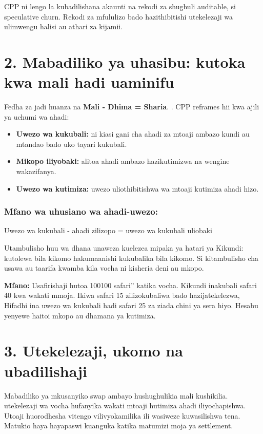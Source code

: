 \documentclass[11pt]{article}
\begin{document}
CPP ni lengo la kubadilishana akaunti na rekodi za shughuli auditable, si speculative churn. Rekodi za mfululizo bado hazithibitishi utekelezaji wa ulimwengu halisi au athari za kijamii.


\section*{2. Mabadiliko ya uhasibu: kutoka kwa mali hadi uaminifu}

Fedha za jadi huanza na \textbf{Mali - Dhima = Sharia}. . CPP reframes hii kwa ajili ya uchumi wa ahadi:

\begin{itemize}[leftmargin=*]
\item \textbf{Uwezo wa kukubali:} ni kiasi gani cha ahadi za mtoaji ambazo kundi au mtandao bado uko tayari kukubali.
\item \textbf{Mikopo iliyobaki:} alitoa ahadi ambazo hazikutimizwa na wengine wakazifanya.
\item \textbf{Uwezo wa kutimiza:} uwezo uliothibitishwa wa mtoaji kutimiza ahadi hizo.
\end{itemize}
\subsubsection*{Mfano wa uhusiano wa ahadi-uwezo:}

Uwezo wa kukubali - ahadi zilizopo = uwezo wa kukubali uliobaki

Utambulisho huu wa dhana unaweza kuelezea mipaka ya hatari ya Kikundi: kutolewa bila kikomo hakumaanishi kukubalika bila kikomo. Si kitambulisho cha usawa au taarifa kwamba kila vocha ni kisheria deni au mkopo.

\textbf{Mfano:} Usafirishaji hutoa 100100 safari'' katika vocha. Kikundi inakubali safari 40 kwa wakati mmoja. Ikiwa safari 15 zilizokubaliwa bado hazijatekelezwa, Hifadhi ina uwezo wa kukubali hadi safari 25 za ziada chini ya sera hiyo. Hesabu yenyewe haitoi mkopo au dhamana ya kutimiza.



\section*{3. Utekelezaji, ukomo na ubadilishaji}

Mabadiliko ya mkusanyiko swap ambayo hushughulikia mali kushikilia. utekelezaji wa vocha hufanyika wakati mtoaji hutimiza ahadi iliyochapishwa. Utoaji huorodhesha vitengo vilivyokamilika ili wasiweze kuwasilishwa tena. Matukio haya hayapaswi kuanguka katika matumizi moja ya settlement.
\end{document}
